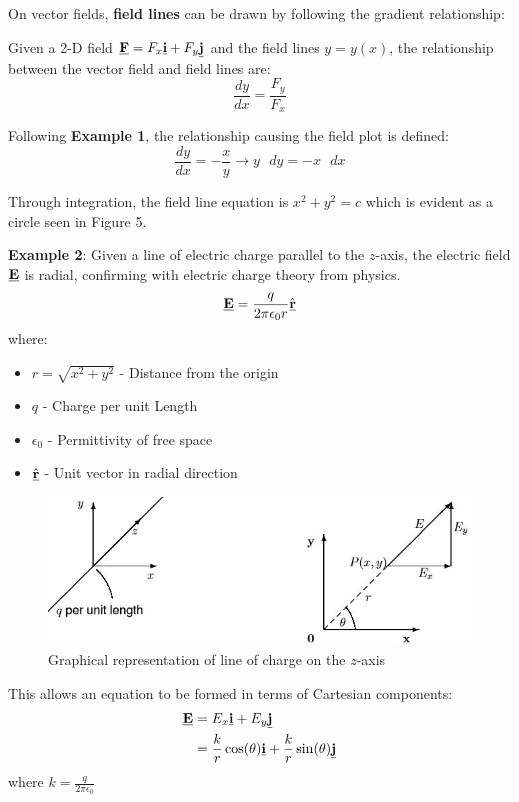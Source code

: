 \documentclass[10pt,a4paper]{article}
\begin{document}
On vector fields, \textbf{field lines} can be drawn by following the gradient relationship:

\begin{tcolorbox}[breakable,colback=white]
Given a 2-D field $\textbf{\underline{F}}=F_x \textbf{\underline{i}} + F_y \textbf{\underline{j}}$ and
the field lines $y=y(x)$, the relationship between the vector field and field lines are:
$$
    \frac{dy}{dx}=\frac{F_y}{F_x}
$$
\end{tcolorbox}

Following \textbf{Example 1}, the relationship causing the field plot is defined: 
$$
    \frac{dy}{dx} = - \frac{x}{y} \rightarrow y\text{ }dy = -x\text{ }dx
$$

Through integration, the field line equation is $x^2 + y^2 = c$ which is evident as a circle seen in Figure 5.

\textbf{Example 2}: Given a line of electric charge parallel to the $z$-axis, the electric field
$\textbf{\underline{E}}$ is radial, confirming with electric charge theory from physics.
$$
    \textbf{\underline{E}}=\frac{q}{2\pi \epsilon_0 r}\hat{\textbf{\underline{r}}}
$$
where:
\begin{itemize}
    \item $r=\sqrt{x^2 + y^2}$ - Distance from the origin
    \item $q$ - Charge per unit Length
    \item $\epsilon_0$ - Permittivity of free space
    \item $\hat{\textbf{\underline{r}}}$ - Unit vector in radial direction
\end{itemize}

\begin{figure} [h!]
    \centering
    \includegraphics[scale=0.7]{Charge.JPG}
    \caption{Graphical representation of line of charge on the $z$-axis}
\end{figure}

This allows an equation to be formed in terms of Cartesian components:
\begin{align*}
    \textbf{\underline{E}} &= E_x \textbf{\underline{i}} + E_y \textbf{\underline{j}} \\
    &= \frac{k}{r}\cos(\theta)\textbf{\underline{i}} + \frac{k}{r}\sin(\theta)\textbf{\underline{j}}
\end{align*}
where $k=\frac{q}{2\pi \epsilon_0}$ \par 
\end{document}
